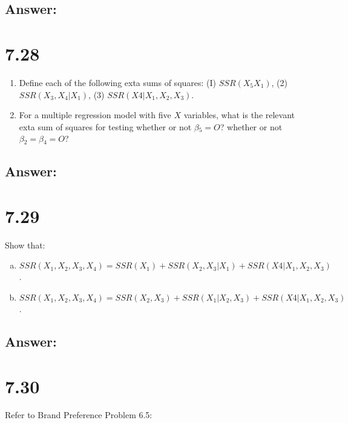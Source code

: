 \documentclass{article}
\begin{document}
\subsection{Answer:}

\section{7.28}

\begin{enumerate}[a]
\item{} Define each of the following exta sums of squares: (I) $SSR(X_5X_1)$, (2) $SSR(X_3,X_4|X_1)$, (3) $SSR(X4|X_1,X_2,X_3)$.
\item{} For a multiple regression model with five $X$ variables, what is the relevant exta sum of squares for testing whether or not $\beta{}_5 = O$? whether or not $\beta{}_2 = \beta{}_4 = O$?
\end{enumerate}

\subsection{Answer:}

\section{7.29}

Show that:
\begin{enumerate}[a)]
\item{} $SSR(X_1,X_2,X_3,X_4) = SSR(X_1) + SSR(X_2,X_3|X_1) + SSR(X4|X_1,X_2,X_3)$.
\item{} $SSR(X_1,X_2,X_3,X_4) = SSR(X_2,X_3) + SSR(X_1|X_2,X_3) + SSR(X4|X_1,X_2,X_3)$.
\end{enumerate}

\subsection{Answer:}

\section{7.30}

Refer to Brand Preference Problem 6.5:
\end{document}

